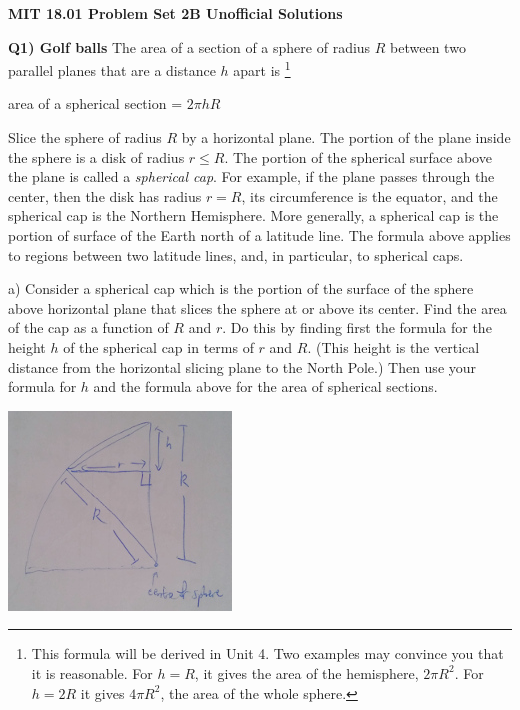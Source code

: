 \documentclass[9pt]{article}
\begin{document}
\begin{center}
  \large\textbf{MIT 18.01 Problem Set 2B Unofficial Solutions}
\end{center}

\begin{tcolorbox}
  \renewcommand{\thefootnote}{\roman{footnote}}
  \parskip10pt\relax
  \textbf{Q1) Golf balls} The area of a section of a sphere of radius $R$ between two parallel planes that are a distance $h$ apart is \footnote{This formula will be derived in Unit 4. Two examples may convince you that it is reasonable. For $h = R$, it gives the area of the hemisphere, $2 \pi R^2.$ For $h = 2R$ it gives $4 \pi R^2$, the area of the whole sphere.}
  \begin{center}
    area of a spherical section = $2 \pi h R$
  \end{center}
  Slice the sphere of radius $R$ by a horizontal plane. The portion of the plane inside the sphere is a disk of radius $r \leq R$. The portion of the spherical surface above the plane is called a \emph{spherical cap}. For example, if the plane passes through the center, then the disk has radius $r = R$, its circumference is the equator, and the spherical cap is the Northern Hemisphere. More generally, a spherical cap is the portion of surface of the Earth north of a latitude line. The formula above applies to regions between two latitude lines, and, in particular, to spherical caps.
  
  a) Consider a spherical cap which is the portion of the surface of the sphere above horizontal plane that slices the sphere at or above its center. Find the area of the cap as a function of $R$ and $r$. Do this by finding first the formula for the height $h$ of the spherical cap in terms of $r$ and $R$. (This height is the vertical distance from the horizontal slicing plane to the North Pole.) Then use your formula for $h$ and the formula above for the area of spherical sections.
\end{tcolorbox}

\begin{center}
  \includegraphics[scale=0.8]{q1a.jpg}
\end{center}
\end{document}
